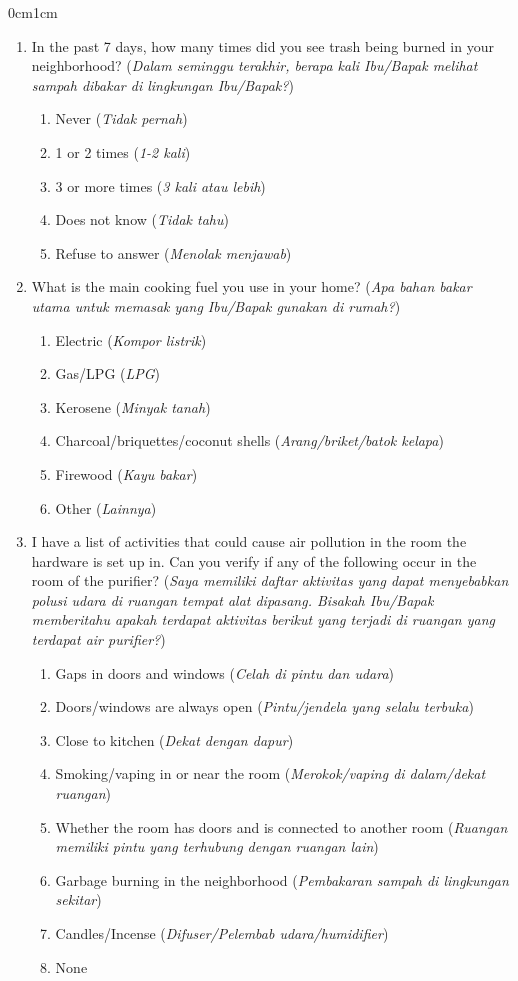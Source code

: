 \documentclass[9pt,twoside]{pnas-new}
\begin{document}
\begin{adjustwidth}{0cm}{1cm}
\begin{enumerate}
    \item In the past 7 days, how many times did you see trash being burned in your neighborhood? (\textit{Dalam seminggu terakhir, berapa kali Ibu/Bapak melihat sampah dibakar di lingkungan Ibu/Bapak?})
    \begin{enumerate}
        \item Never (\textit{Tidak pernah})
        \item 1 or 2 times (\textit{1-2 kali})
        \item 3 or more times (\textit{3 kali atau lebih})
        \item Does not know (\textit{Tidak tahu})
        \item Refuse to answer (\textit{Menolak menjawab})
    \end{enumerate}
    \item What is the main cooking fuel you use in your home? (\textit{Apa bahan bakar utama untuk memasak yang Ibu/Bapak gunakan di rumah?})
    \begin{enumerate}
        \item Electric (\textit{Kompor listrik})
        \item Gas/LPG (\textit{LPG})
        \item Kerosene (\textit{Minyak tanah})
        \item Charcoal/briquettes/coconut shells (\textit{Arang/briket/batok kelapa})
        \item Firewood (\textit{Kayu bakar})
        \item Other (\textit{Lainnya})
    \end{enumerate}

    
    \item I have a list of activities that could cause air pollution in the room the hardware is set up in. Can you verify if any of the following occur in the room of the purifier? (\textit{Saya memiliki daftar aktivitas yang dapat menyebabkan polusi udara di ruangan tempat alat dipasang. Bisakah Ibu/Bapak memberitahu apakah terdapat aktivitas berikut yang terjadi di ruangan yang terdapat air purifier?})
    \begin{enumerate}
        \item Gaps in doors and windows (\textit{Celah di pintu dan udara})
        \item Doors/windows are always open (\textit{Pintu/jendela yang selalu terbuka})
        \item Close to kitchen (\textit{Dekat dengan dapur})
        \item Smoking/vaping in or near the room (\textit{Merokok/vaping di dalam/dekat ruangan})
        \item Whether the room has doors and is connected to another room (\textit{Ruangan memiliki pintu yang terhubung dengan ruangan lain})
        \item Garbage burning in the neighborhood (\textit{Pembakaran sampah di lingkungan sekitar})
        \item Candles/Incense (\textit{Difuser/Pelembab udara/humidifier})
        \item None
    \end{enumerate}


\end{enumerate}
\end{adjustwidth}
\end{document}
